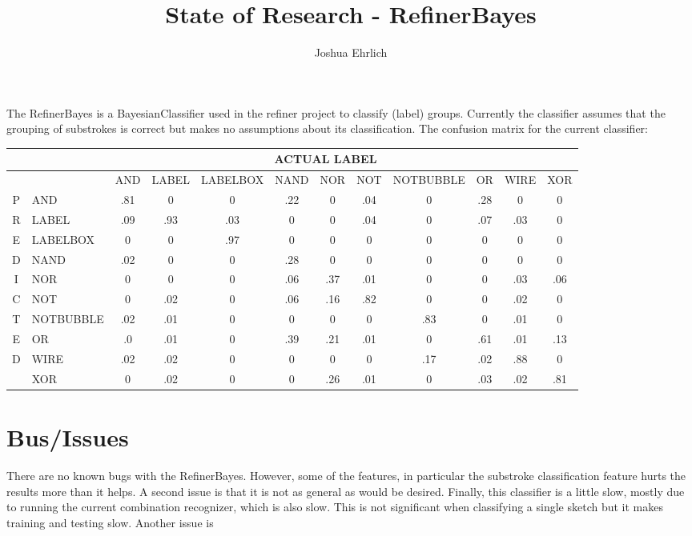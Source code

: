 \documentclass{article}
\title{State of Research - RefinerBayes}
\author{Joshua Ehrlich}
\begin{document}
\maketitle

The RefinerBayes is a BayesianClassifier used in the refiner project to classify (label) groups.  Currently the classifier assumes that the grouping of substrokes is correct but makes no assumptions about its classification.
The confusion matrix for the current classifier:


\begin{tabular}{|c|l|c|c|c|c|c|c|c|c|c|c|}
\hline
&&\multicolumn{9}{c}{ACTUAL LABEL}\\
\hline
&&\tiny{AND}&\tiny{LABEL}&\tiny{LABELBOX}&\tiny{NAND}&\tiny{NOR}&\tiny{NOT}&\tiny{NOTBUBBLE}&\tiny{OR}&\tiny{WIRE}&\tiny{XOR}\\
\hline
P&\tiny{AND}&.81&0&0&.22&0&.04&0&.28&0&0\\
R&\tiny{LABEL}&.09&.93&.03&0&0&.04&0&.07&.03&0\\
E&\tiny{LABELBOX}&0&0&.97&0&0&0&0&0&0&0\\
D&\tiny{NAND}&.02&0&0&.28&0&0&0&0&0&0\\
I&\tiny{NOR}&0&0&0&.06&.37&.01&0&0&.03&.06\\
C&\tiny{NOT}&0&.02&0&.06&.16&.82&0&0&.02&0\\
T&\tiny{NOTBUBBLE}&.02&.01&0&0&0&0&.83&0&.01&0\\
E&\tiny{OR}&.0&.01&0&.39&.21&.01&0&.61&.01&.13\\
D&\tiny{WIRE}&.02&.02&0&0&0&0&.17&.02&.88&0\\
&\tiny{XOR}&0&.02&0&0&.26&.01&0&.03&.02&.81\\
\hline
\end{tabular}
\newline


\section{Bus/Issues}
There are no known bugs with the RefinerBayes.  However, some of the features, in particular the substroke classification feature hurts the results more than it helps.  A second issue is that it is not as general as would be desired.  Finally, this classifier is a little slow, mostly due to running the current combination recognizer, which is also slow.  This is not significant when classifying a single sketch but it makes training and testing slow.  Another issue is 
\end{document}
